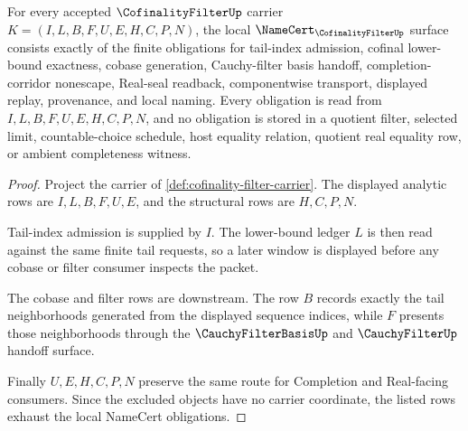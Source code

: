 \begin{theorem}\label{thm:cofinality-filter-namecert-obligations}
For every accepted $\CofinalityFilterUp$ carrier $K=(I,L,B,F,U,E,H,C,P,N)$, the local $\NameCert_{\CofinalityFilterUp}$ surface consists exactly of the finite obligations for tail-index admission, cofinal lower-bound exactness, cobase generation, Cauchy-filter basis handoff, completion-corridor nonescape, Real-seal readback, componentwise transport, displayed replay, provenance, and local naming. Every obligation is read from $I,L,B,F,U,E,H,C,P,N$, and no obligation is stored in a quotient filter, selected limit, countable-choice schedule, host equality relation, quotient real equality row, or ambient completeness witness.
\end{theorem}
\begin{proof}
Project the carrier of \autoref{def:cofinality-filter-carrier}. The displayed analytic rows are $I,L,B,F,U,E$, and the structural rows are $H,C,P,N$.

Tail-index admission is supplied by $I$. The lower-bound ledger $L$ is then read against the same finite tail requests, so a later window is displayed before any cobase or filter consumer inspects the packet.

The cobase and filter rows are downstream. The row $B$ records exactly the tail neighborhoods generated from the displayed sequence indices, while $F$ presents those neighborhoods through the $\CauchyFilterBasisUp$ and $\CauchyFilterUp$ handoff surface.

Finally $U,E,H,C,P,N$ preserve the same route for Completion and Real-facing consumers. Since the excluded objects have no carrier coordinate, the listed rows exhaust the local NameCert obligations.
\end{proof}

